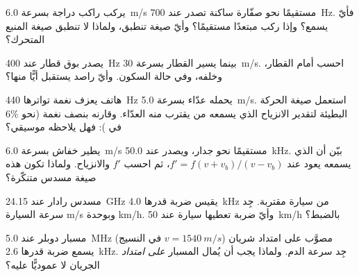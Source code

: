 \begin{exercise}[$\star$]\label{exo:g12:doppler-effect:3}
يركب راكب دراجة بسرعة \qty{6.0}{m/s} مستقيمًا نحو صفّارة ساكنة تصدر عند \qty{700}{Hz}.
فأيّ  يسمع؟ وإذا ركب مبتعدًا مستقيمًا؟ وأيّ صيغة تنطبق، ولماذا لا تنطبق
صيغة المنبع المتحرك؟
\end{exercise}

\begin{exercise}[$\star$]\label{exo:g12:doppler-effect:4}
يصدر بوق قطار عند \qty{400}{Hz} بينما يسير القطار بسرعة \qty{30}{m/s}. احسب
 أمام القطار، وخلفه، وفي حالة السكون. وأيّ راصد يستقبل أيًّا منها؟
\end{exercise}

\begin{exercise}[$\star$]\label{exo:g12:doppler-effect:5}
هاتف يعزف نغمة تواترها \qty{440}{Hz} يحمله عدّاء بسرعة \qty{5.0}{m/s}. استعمل
صيغة الحركة البطيئة لتقدير الانزياح الذي يسمعه من يقترب منه العدّاء. وقارنه
بنصف نغمة (نحو $6\%$ في ): فهل يلاحظه موسيقي؟
\end{exercise}

\begin{exercise}[$\star\star$]\label{exo:g12:doppler-effect:6}
يطير خفاش بسرعة \qty{6.0}{m/s} مستقيمًا نحو جدار، ويصدر عند \qty{50.0}{kHz}. بيّن أن
 الذي يسمعه يعود عند $f' = f(v + v_b)/(v - v_b)$، ثم احسب $f'$ والانزياح.
ولماذا تكون هذه صيغة مسدس  متنكّرة؟
\end{exercise}

\begin{exercise}[$\star\star$]\label{exo:g12:doppler-effect:7}
مسدس رادار عند \qty{24.15}{GHz} يقيس ضربة قدرها \qty{4.0}{kHz} من سيارة مقتربة.
جِد سرعة السيارة  \unit{m/s} وبوحدة \unit{km/h}. وأيّ ضربة تعطيها سيارة عند
\qty{50}{km/h} بالضبط؟
\end{exercise}

\begin{exercise}[$\star\star$]\label{exo:g12:doppler-effect:8}
مسبار دوبلر  عند \qty{5.0}{MHz} مصوَّب على امتداد شريان ($v = \qty{1540}{m/s}$ في
النسيج) يسمع ضربة قدرها \qty{2.6}{kHz}. جِد سرعة الدم. ولماذا يجب أن يُمال المسبار
\emph{على امتداد} الجريان لا عموديًّا عليه؟
\end{exercise}

